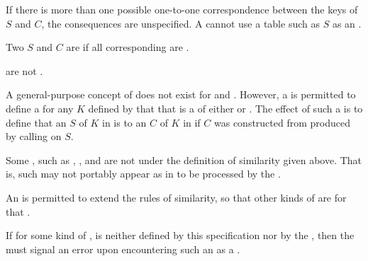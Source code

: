 If there is more than one possible one-to-one correspondence between
the keys of $S$ and $C$, the consequences are unspecified.  
A  cannot use a table such as $S$ as an
.
 
 
Two  $S$ and $C$ are  if all corresponding 
 are .

 
 are not .


A general-purpose concept of  does not exist for 
and .
However, a  is permitted to define a 
 for any  $K$ defined by that  that is
a  of either  or .
The effect of such a  is to define that an  $S$ of  $K$
in  is  to an  $C$ of  $K$
in  if $C$ was constructed from  produced by 
calling  on $S$.

\endlist

\endsubsubsection%


Some , such as , , and 
are not  under the definition of similarity given above.
That is, such  may not portably appear as   
in  to be processed by the . 

An  is permitted to extend the rules of similarity, 
so that other kinds of  are 
for that .

If for some kind of ,  is
neither defined by this specification 
	    nor by the , 
then the  must signal an error upon encountering such 
an  as a .

